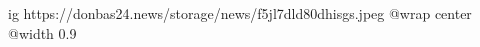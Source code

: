  
 
 
 
 

\ifcmt
  ig https://donbas24.news/storage/news/f5jl7dld80dhisgs.jpeg
  @wrap center
  @width 0.9
\fi

